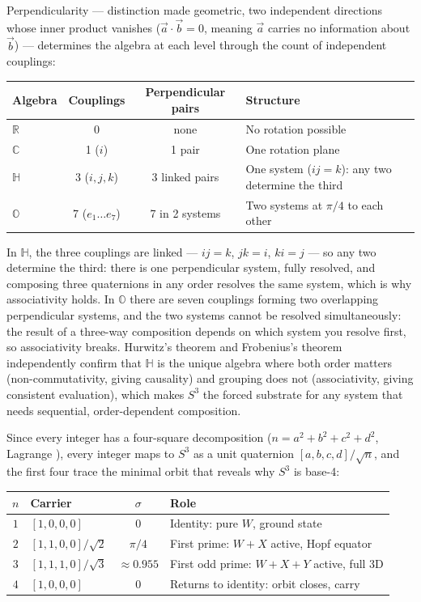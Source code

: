 \documentclass[12pt]{article}
\begin{document}
Perpendicularity --- distinction made geometric, two independent directions whose inner product vanishes ($\vec{a} \cdot \vec{b} = 0$, meaning $\vec{a}$ carries no information about $\vec{b}$) --- determines the algebra at each level through the count of independent couplings:

\begin{center}
\begin{tabular}{l c c l}
    \toprule
    Algebra & Couplings & Perpendicular pairs & Structure \\
    \midrule
    $\mathbb{R}$ & 0 & none & No rotation possible \\
    $\mathbb{C}$ & 1 ($i$) & 1 pair & One rotation plane \\
    $\mathbb{H}$ & 3 ($i,j,k$) & 3 linked pairs & One system ($ij = k$): any two determine the third \\
    $\mathbb{O}$ & 7 ($e_1 \ldots e_7$) & 7 in 2 systems & Two systems at $\pi/4$ to each other \\
    \bottomrule
\end{tabular}
\end{center}

In $\mathbb{H}$, the three couplings are linked --- $ij = k$, $jk = i$, $ki = j$ --- so any two determine the third: there is one perpendicular system, fully resolved, and composing three quaternions in any order resolves the same system, which is why associativity holds. In $\mathbb{O}$ there are seven couplings forming two overlapping perpendicular systems, and the two systems cannot be resolved simultaneously: the result of a three-way composition depends on which system you resolve first, so associativity breaks. Hurwitz's theorem \cite{hurwitz} and Frobenius's theorem \cite{frobenius} independently confirm that $\mathbb{H}$ is the unique algebra where both order matters (non-commutativity, giving causality) and grouping does not (associativity, giving consistent evaluation), which makes $S^3$ the forced substrate for any system that needs sequential, order-dependent composition.

Since every integer has a four-square decomposition ($n = a^2 + b^2 + c^2 + d^2$, Lagrange \cite{lagrange}), every integer maps to $S^3$ as a unit quaternion $[a,b,c,d]/\sqrt{n}$, and the first four trace the minimal orbit that reveals why $S^3$ is base-4:

\begin{center}
\begin{tabular}{c l c l}
    \toprule
    $n$ & Carrier & $\sigma$ & Role \\
    \midrule
    $1$ & $[1, 0, 0, 0]$ & $0$ & Identity: pure $W$, ground state \\
    $2$ & $[1, 1, 0, 0]/\sqrt{2}$ & $\pi/4$ & First prime: $W{+}X$ active, Hopf equator \\
    $3$ & $[1, 1, 1, 0]/\sqrt{3}$ & $\approx 0.955$ & First odd prime: $W{+}X{+}Y$ active, full 3D \\
    $4$ & $[1, 0, 0, 0]$ & $0$ & Returns to identity: orbit closes, carry \\
    \bottomrule
\end{tabular}
\end{center}
\end{document}
